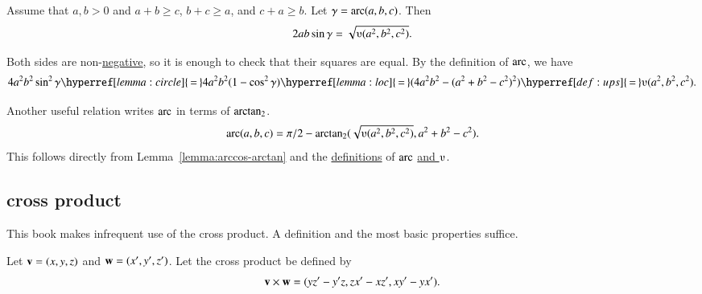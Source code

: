 \begin{lemma}\label{lemma:los}
Assume that $a,b>0$ and $a+b\ge c$, $b+c\ge a$, and $c+a\ge b$.
Let $\gamma=\operatorname{arc}(a,b,c)$.  Then
\begin{displaymath}2 a b \sin\gamma =
  \sqrt{\ups(a^2,b^2,c^2)}.\end{displaymath}
\end{lemma}
%
%
%
\begin{proved}
  Both sides are non-\hyperref[lemma:sin-pos]{negative}, so it is
  enough to check that their squares are equal.  By the definition of
  $\operatorname{arc}$, we have
\begin{displaymath}
4 a^2 b^2 \sin^2\gamma 
\hyperref[lemma:circle]{\,=\,} 4 a^2 b^2 (1-\cos^2\gamma) 
\hyperref[lemma:loc]{\,=\,} (4 a^2 b^2 - (a^2 + b^2 -
c^2)^2) 
\hyperref[def:ups]{\,=\,} \ups(a^2,b^2,c^2).\end{displaymath}
\swallowed\end{proved}

Another useful relation writes $\operatorname{arc}$ in terms of ${\operatorname{arctan_2}}$.
\begin{equation}\label{eqn:arc-atn}
\arc(a,b,c) = 
\pi/2 - \atn({\sqrt{\ups(a^2,b^2,c^2)}},{ a^2 + b^2 - c^2}).
\end{equation}
This follows directly from Lemma~\ref{lemma:arccos-arctan} and the
\hyperref[def:arc]{definitions} of $\operatorname{arc}$ \hyperref[def:ups]{and
  $\ups$}.



\subsection{cross product} \label{sec:cross}

This book makes infrequent use of the cross product.
A definition and the most basic properties  suffice.

\begin{definition}\label{def:cross}
Let ${\mathbf v} =(x,y,z)$ and ${\mathbf w} = (x',y',z')$.  
Let the cross product be defined
by
\begin{displaymath}
{\mathbf v} \times {\mathbf w} = (y z' - y' z, z x' - x z', x y' - y x').
\end{displaymath}
%
%
%
\end{definition}

